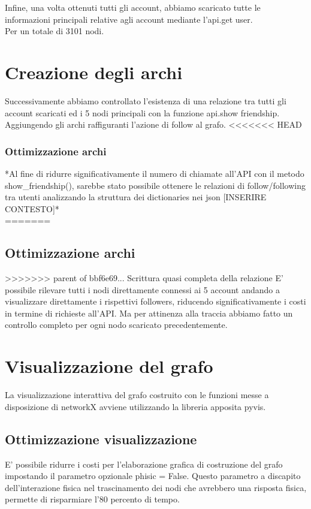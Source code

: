 \documentclass[a4paper,11pt]{report}
\begin{document}
Infine, una volta ottenuti tutti gli account, abbiamo scaricato tutte le informazioni principali relative agli account mediante l'api.get user.\\
Per un totale di 3101 nodi.
\section{Creazione degli archi}
Successivamente abbiamo controllato l'esistenza di una relazione tra tutti gli account scaricati ed i 5 nodi principali con la funzione api.show friendship. Aggiungendo gli archi raffiguranti l'azione di follow al grafo.
<<<<<<< HEAD
\subsubsection{Ottimizzazione archi}
*Al fine di ridurre significativamente il numero di chiamate all'API con il metodo show_friendship(), sarebbe stato possibile ottenere le relazioni di follow/following tra utenti analizzando la struttura dei dictionaries nei json [INSERIRE CONTESTO]*\\
=======
\subsection{Ottimizzazione archi}
>>>>>>> parent of bbf6e69... Scrittura quasi completa della relazione
E' possibile rilevare tutti i nodi direttamente connessi ai 5 account andando a visualizzare direttamente i rispettivi followers, riducendo significativamente i costi in termine di richieste all'API. Ma per attinenza alla traccia abbiamo fatto un controllo completo per ogni nodo scaricato precedentemente.

\section{Visualizzazione del grafo}
La visualizzazione interattiva del grafo costruito con le funzioni messe a disposizione di networkX avviene utilizzando la libreria apposita pyvis.
\subsection{Ottimizzazione visualizzazione}
E' possibile ridurre i costi per l'elaborazione grafica di costruzione del grafo impostando il parametro opzionale phisic = False. Questo parametro a discapito dell'interazione fisica nel trascinamento  dei nodi che avrebbero una risposta fisica, permette di risparmiare l'80 percento di tempo.
\end{document}

